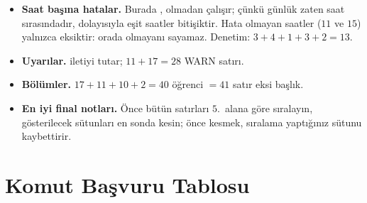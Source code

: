 \begin{itemize}
  \item \textbf{Saat başına hatalar.} Burada ,  olmadan çalışır; çünkü günlük zaten saat sırasındadır, dolayısıyla eşit saatler bitişiktir. Hata olmayan saatler ($11$ ve $15$) yalnızca eksiktir:  orada olmayanı sayamaz. Denetim: $3 + 4 + 1 + 3 + 2 = 13$.
  \item \textbf{Uyarılar.}  iletiyi tutar; $11 + 17 = 28$ WARN satırı.
  \item \textbf{Bölümler.} $17 + 11 + 10 + 2 = 40$ öğrenci $= 41$ satır eksi başlık.
  \item \textbf{En iyi final notları.} Önce bütün satırları $5$.~alana göre sıralayın, gösterilecek sütunları en sonda kesin; önce kesmek, sıralama yaptığınız sütunu kaybettirir.
\end{itemize}

\section{Komut Başvuru Tablosu}
\label{sec:ref}

